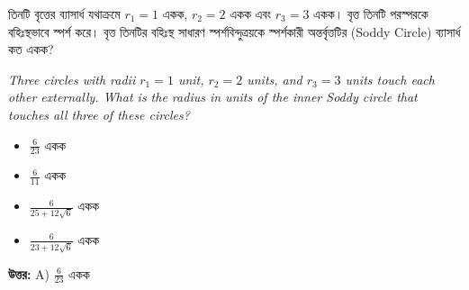 \documentclass[12pt, a4paper]{article}
\begin{document}
\begin{tcolorbox}[questionbox={প্রশ্ন (Question) 32}]
    \noindent
    তিনটি বৃত্তের ব্যাসার্ধ যথাক্রমে $r_1 = 1$ একক, $r_2 = 2$ একক এবং $r_3 = 3$ একক। বৃত্ত তিনটি পরস্পরকে বহিঃস্থভাবে স্পর্শ করে। বৃত্ত তিনটির বহিঃস্থ সাধারণ স্পর্শবিন্দুত্রয়কে স্পর্শকারী অন্তর্বৃত্তটির (Soddy Circle) ব্যাসার্ধ কত একক?
    
    \vspace{0.8em}
    \begin{english}
    \noindent\textit{\color{darkgray}
    Three circles with radii $r_1 = 1$ unit, $r_2 = 2$ units, and $r_3 = 3$ units touch each other externally. What is the radius in units of the inner Soddy circle that touches all three of these circles?
    }
    \end{english}
\end{tcolorbox}

\vspace{1em}
\begin{itemize}[label={}, leftmargin=1cm, itemsep=0.5em]
    \item[\textbf{A)}] $\frac{6}{23}$ একক
    \item[\textbf{B)}] $\frac{6}{11}$ একক
    \item[\textbf{C)}] $\frac{6}{25 + 12\sqrt{6}}$ একক
    \item[\textbf{D)}] $\frac{6}{23 + 12\sqrt{6}}$ একক
\end{itemize}

\vspace{0.5em}
\begin{tcolorbox}[answerbox]
    \textbf{\color{success} উত্তর:} A) $\frac{6}{23}$ একক
\end{tcolorbox}
\vspace{1em}
\end{document}
